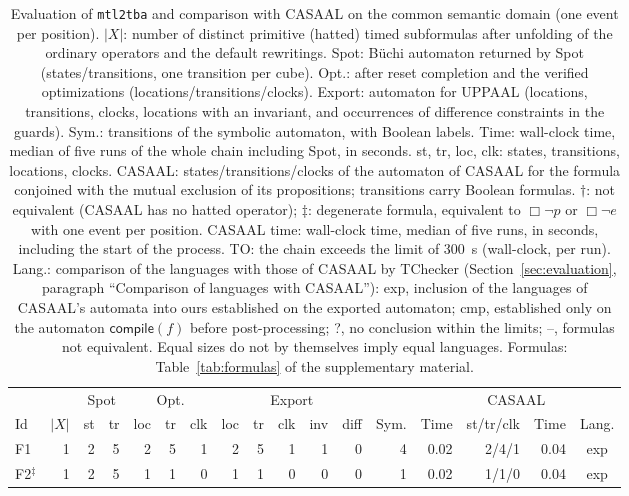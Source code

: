 \begin{table}[t]
\centering
\caption{Evaluation of \texttt{mtl2tba} and comparison with CASAAL on the common semantic domain (one event per position).  $|X|$: number of distinct primitive (hatted) timed subformulas after unfolding of the ordinary operators and the default rewritings.  Spot: B\"uchi automaton returned by Spot (states/transitions, one transition per cube).  Opt.: after reset completion and the verified optimizations (locations/transitions/clocks).  Export: automaton for UPPAAL (locations, transitions, clocks, locations with an invariant, and occurrences of difference constraints in the guards).  Sym.: transitions of the symbolic automaton, with Boolean labels.  Time: wall-clock time, median of five runs of the whole chain including Spot, in seconds.  st, tr, loc, clk: states, transitions, locations, clocks.  CASAAL: states/transitions/clocks of the automaton of CASAAL for the formula conjoined with the mutual exclusion of its propositions; transitions carry Boolean formulas.  $\dagger$: not equivalent (CASAAL has no hatted operator); $\ddagger$: degenerate formula, equivalent to $\Box\neg p$ or $\Box\neg e$ with one event per position.  CASAAL time: wall-clock time, median of five runs, in seconds, including the start of the process.  TO: the chain exceeds the limit of 300~s (wall-clock, per run).  Lang.: comparison of the languages with those of CASAAL by TChecker (Section~\ref{sec:evaluation}, paragraph ``Comparison of languages with CASAAL''): exp, inclusion of the languages of CASAAL's automata into ours established on the exported automaton; cmp, established only on the automaton $\mathsf{compile}(f)$ before post-processing; ?, no conclusion within the limits; --, formulas not equivalent.  Equal sizes do not by themselves imply equal languages.  Formulas: Table~\ref{tab:formulas} of the supplementary material.}
\label{tab:evaluation}
\small
\setlength{\tabcolsep}{4.5pt}
\begin{tabular}{@{}lrrrrrrrrrrrrrrrc@{}}
\toprule
 & & \multicolumn{2}{c}{Spot} & \multicolumn{3}{c}{Opt.} & \multicolumn{5}{c}{Export} & & & \multicolumn{2}{c}{CASAAL} & \\
\cmidrule(lr){3-4}\cmidrule(lr){5-7}\cmidrule(lr){8-12}\cmidrule(lr){15-16}
Id & $|X|$ & st & tr & loc & tr & clk & loc & tr & clk & inv & diff & Sym. & Time & st/tr/clk & Time & Lang.\\
\midrule
F1 & 1 & 2 & 5 & 2 & 5 & 1 & 2 & 5 & 1 & 1 & 0 & 4 & 0.02 & 2/4/1 & 0.04 & exp\\
F2$^\ddagger$ & 1 & 2 & 5 & 1 & 1 & 0 & 1 & 1 & 0 & 0 & 0 & 1 & 0.02 & 1/1/0 & 0.04 & exp\\

\end{tabular}
\end{table}
